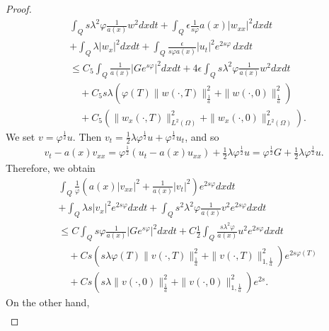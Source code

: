 \documentclass[reqno]{amsart}
\theoremstyle{plain}
\theoremstyle{remark}
\numberwithin{equation}{section}
\begin{document}
\begin{proof}
\begin{equation*}
    \begin{split}
          &\int_{Q} s\lambda^2 \varphi \frac{1}{a(x)}w^2 dxdt + \int_{Q} \epsilon\frac{1}{s\varphi}a(x)\vert w_{xx}\vert^2 dx dt\\&+\int_{Q} \lambda \vert w_{x}\vert^2 dx dt+\int_{Q}\frac{\epsilon}{s\varphi a(x)}\vert u_{t}\vert^2 e^{2s\varphi}\, dxdt\\& \leqslant C_{5}  \int_{Q}\frac{1}{a(x)}\vert Ge^{s\varphi}\vert^2 dxdt + 4\epsilon \int_{Q} s\lambda^2\varphi \frac{1}{a(x)}w^2 dxdt \\& \quad+C_{5}s\lambda \left(\varphi(T)\| w(\cdot,T)\|_{\frac{1}{a}}^2+\| w(\cdot,0)\|_{\frac{1}{a}}^2 \right)\\&\quad+C_{5}\left( \| w_{x}(\cdot,T)\|_{L^2(\Omega)}^2+\| w_{x}(\cdot,0)\|_{L^2(\Omega)}^2\right).
    \end{split}
\end{equation*}
We set $v=\varphi^{\frac{1}{2}}u$. Then $ v_{t}=\frac{1}{2}\lambda \varphi^{\frac{1}{2}}u+\varphi^{\frac{1}{2}}u_{t}$, and so
\begin{align}
    v_{t}-a(x)v_{xx}=\varphi^{\frac{1}{2}}(u_{t}-a(x)u_{xx})+ \frac{1}{2}\lambda\varphi^{\frac{1}{2}} u= \varphi^{\frac{1}{2}} G +\frac{1}{2}\lambda\varphi^{\frac{1}{2}} u.
\end{align}
Therefore, we obtain 
\begin{equation*}\label{14}
    \begin{split}
         & \int_{Q} \frac{1}{\varphi}\left(a(x)\vert v_{xx}\vert^2+\frac{1}{ a(x)}\vert v_{t}\vert^2 \right)e^{2s\varphi}dx dt\\&+\int_{Q} \lambda s\vert v_{x}\vert^2 e^{2s\varphi} dx dt+\int_{Q} s^2\lambda^2 \varphi \frac{1}{a(x)}v^2 e^{2s\varphi} dxdt\\& \leqslant C  \int_{Q}s\varphi\frac{1}{a(x)}\vert Ge^{s\varphi}\vert^2 dxdt +C\frac{1}{2}\int_{Q}\frac{s\lambda^2\varphi}{a(x)}u^2 e^{2s\varphi}dxdt  \\ &\quad +C s\left( s\lambda\varphi(T)\| v(\cdot,T)\|_{\frac{1}{a}}^2+\| v(\cdot,T)\|_{1,\frac{1}{a}}^2 \right)e^{2s\varphi(T)}\\& 
         \quad +Cs\left( s\lambda\| v(\cdot,0)\|_{\frac{1}{a}}^2+\| v(\cdot,0)\|_{1,\frac{1}{a}}^2\right)e^{2s}.
    \end{split}
\end{equation*}
On the other hand,
\begin{equation*}
    \begin{aligned}

\end{aligned}
\end{equation*}
\end{proof}
\end{document}

